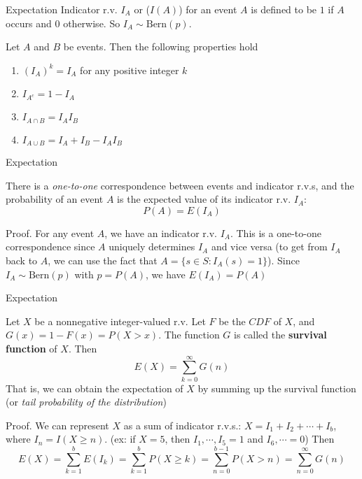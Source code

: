 \documentclass{beamer}
\newcommand{\tb}[1]{\textbf{#1}}
\newcommand{\ti}[1]{\textit{#1}}
\begin{document}
\begin{frame}{Expectation}
    Indicator r.v.  $I_A$ or ($I(A)$) for an event $A$ is defined to be $1$ if $A$ occurs and $0$ otherwise. So $I_A \sim \text{Bern}(p)$. 
    \begin{theorem}
        Let $A$ and $B$ be events. Then the following properties hold
        \begin{enumerate}
            \item $(I_A)^k = I_A$ for any positive integer $k$
            \item $I_{A^c} = 1 - I_A$
            \item $I_{A \cap B} = I_A I_B$
            \item $I_{A \cup B} = I_A + I_B - I_A I_B$
        \end{enumerate}
    \end{theorem}
\end{frame}

\begin{frame}{Expectation}
    \begin{theorem}
        There is a \ti{one-to-one} correspondence between events and indicator r.v.s, and the probability of an event $A$ is the expected value of its indicator r.v. $I_A$: 
        \[
        P(A) = E(I_A)
        \]
    \end{theorem}

    Proof. For any event $A$, we have an indicator r.v. $I_A$. This is a one-to-one correspondence since $A$ uniquely determines $I_A$ and vice versa (to get from $I_A$ back to $A$, we can use the fact that $A = \{s \in S: I_A(s) = 1\}$). Since $I_A \sim \text{Bern}(p)$ with $p = P(A)$, we have $E(I_A) = P(A)$
\end{frame}

\begin{frame}{Expectation}
    \begin{theorem} \label{thm:expectation_via_survival_function}
        Let $X$ be a nonnegative integer-valued r.v. Let $F$ be the $CDF$ of $X$, and $G(x)=1-F(x)=P(X>x)$. The function $G$ is called the \tb{survival function} of $X$. Then
        \[
            E(X) = \sum^\infty_{k=0} G(n)
        \]
        That is, we can obtain the expectation of $X$ by summing up the survival function (or \ti{tail probability of the distribution})
    \end{theorem}
    Proof. We can represent $X$ as a sum of indicator r.v.s.: $X = I_1 + I_2 + \cdots + I_b$, where $I_n = I(X \geq n)$. (ex: if $X=5$, then $I_1, \cdots, I_5 = 1$ and $I_6, \cdots = 0$) Then
    \[
        E(X) = \sum^b_{k=1} E(I_k) = \sum^b_{k=1} P(X \geq k ) = \sum^{b-1}_{n=0} P(X > n) = \sum^\infty_{n=0} G(n)
    \]
\end{frame}
\end{document}
